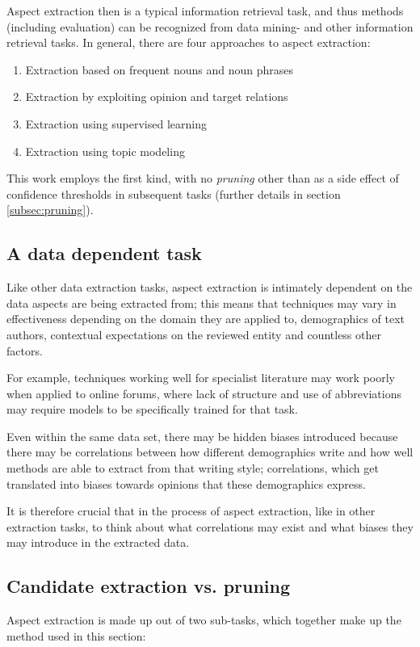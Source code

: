 \documentclass[a4paper,11pt]{kth-mag}
\begin{document}
Aspect extraction then is a typical information retrieval task, and thus methods
(including evaluation) can be recognized from data mining- and other information retrieval tasks.
In general, there are four approaches to aspect extraction\cite[chapter 5.3]{liu2012sentiment}:

\begin{enumerate}
\item Extraction based on frequent nouns and noun phrases
\item Extraction by exploiting opinion and target relations
\item Extraction using supervised learning
\item Extraction using topic modeling
\end{enumerate}
This work employs the first kind, with no \emph{pruning} other than as a side effect of
confidence thresholds in subsequent tasks (further details in section \ref{subsec:pruning}).


\subsection{A data dependent task}
Like other data extraction tasks, aspect extraction is intimately dependent on the data
aspects are being extracted from; this means that techniques may vary in effectiveness
depending on the domain they are applied to, demographics of text authors, 
contextual expectations on the reviewed entity and countless other factors.

For example, techniques working well for specialist literature may work poorly when applied
to online forums, where lack of structure and use of abbreviations may require models to be specifically
trained for that task.

Even within the same data set, there may be hidden biases introduced because there may be correlations
between how different demographics write and how well methods are able to extract from that writing style;
correlations, which get translated into biases towards opinions that these demographics express.

It is therefore crucial that in the process of aspect extraction, like in other extraction tasks,
to think about what correlations may exist and what biases they may introduce in the extracted data.


\subsection{Candidate extraction vs. pruning}
Aspect extraction is made up out of two sub-tasks, which together make up the method used in this section:
\end{document}
